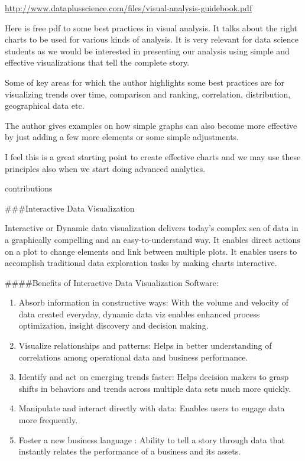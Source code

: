 \documentclass[]{book}
\providecommand{\tightlist}{%
  \setlength{\itemsep}{0pt}\setlength{\parskip}{0pt}}
\theoremstyle{definition}
\theoremstyle{definition}
\theoremstyle{definition}
\theoremstyle{remark}
\begin{document}
\url{http://www.dataplusscience.com/files/visual-analysis-guidebook.pdf}

Here is free pdf to some best practices in visual analysis. It talks
about the right charts to be used for various kinds of analysis. It is
very relevant for data science students as we would be interested in
presenting our analysis using simple and effective visualizations that
tell the complete story.

Some of key areas for which the author highlights some best practices
are for visualizing trends over time, comparison and ranking,
correlation, distribution, geographical data etc.

The author gives examples on how simple graphs can also become more
effective by just adding a few more elements or some simple adjustments.

I feel this is a great starting point to create effective charts and we
may use these principles also when we start doing advanced analytics.

contributions

\#\#\#Interactive Data Visualization

Interactive or Dynamic data visualization delivers today's complex sea
of data in a graphically compelling and an easy-to-understand way. It
enables direct actions on a plot to change elements and link between
multiple plots. It enables users to accomplish traditional data
exploration tasks by making charts interactive.

\#\#\#\#Benefits of Interactive Data Visualization Software:

\begin{enumerate}
\def\labelenumi{\arabic{enumi}.}
\tightlist
\item
  Absorb information in constructive ways: With the volume and velocity
  of data created everyday, dynamic data viz enables enhanced process
  optimization, insight discovery and decision making.
\item
  Visualize relationships and patterns: Helps in better understanding of
  correlations among operational data and business performance.
\item
  Identify and act on emerging trends faster: Helps decision makers to
  grasp shifts in behaviors and trends across multiple data sets much
  more quickly.
\item
  Manipulate and interact directly with data: Enables users to engage
  data more frequently.
\item
  Foster a new business language : Ability to tell a story through data
  that instantly relates the performance of a business and its assets.
\end{enumerate}
\end{document}
